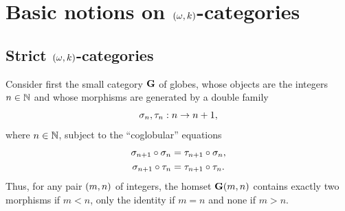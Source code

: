 \section{Basic notions on\texorpdfstring{ $(\omega,k)$}{(ω,k)}-categories}\label{sec:basics}
\subsection{Strict \texorpdfstring{$(\omega,k)$}{(ω,k)}-categories}\label{subsec:okcat}

\begin{paragr}
  Consider first the small category $\mathbf{G}$ of globes, whose objects are
the integers $n\in\mathbb N$ and whose morphisms 
are generated by a double family
  \[
  \sigma_{n},\tau_{n}: n\to n+1,
\]
where $n\in\mathbb N$,
subject to the ``coglobular'' equations
\begin{align*}
  \sigma_{n+1}\circ\sigma_{n} & = \tau_{n+1}\circ\sigma_{n},\\
  \sigma_{n+1}\circ\tau_{n} & = \tau_{n+1}\circ\tau_{n}.
\end{align*}
Thus, for any pair $(m,n)$ of integers, the homset $\mathbf{G}(m,n)$ contains exactly two morphisms if $m<n$, only the identity if $m=n$ and none if $m>n$.

\end{paragr}

